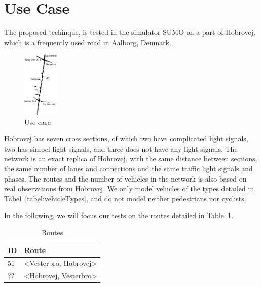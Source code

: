 \section{Use Case}
The proposed techinque, \tech is tested in the simulator SUMO on a part of Hobrovej, which is a frequently used road in Aalborg, Denmark.

\begin{figure}[htb]
\centering
\includegraphics[width=0.15\textwidth]{images/Hobrovej.png}
\caption{Use case}
\label{fig:Introduction:hobro}
\end{figure}

Hobrovej has seven cross sections, of which two have complicated light signals, two has simpel light signals, and three does not have any light signals. %
The network is an exact replica of Hobrovej, with the same distance between sections, the same number of lanes and connections and the same traffic light signals and phases.
The routes and the number of vehicles in the network is also based on real observations from Hobrovej.
We only model vehicles of the types detailed in Tabel~\ref{tabel:vehicleTypes}, and do not model neither pedestrians nor cyclists.

In the following, we will focus our tests on the routes detailed in Table~\ref{tb:useCase:routes}.
\begin{table} %
\centering
\begin{tabular}{|l|l|}\hline
\textbf{ID} & \textbf{Route}\\\hline
51 & <Vesterbro, Hobrovej>\\\hline
?? & <Hobrovej, Vesterbro>\\\hline
\end{tabular}
\caption{Routes}\label{tb:useCase:routes}
\end{table}